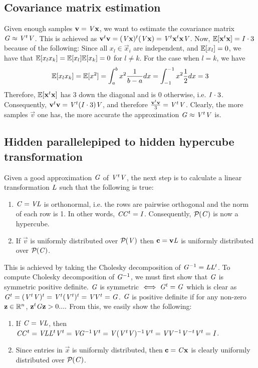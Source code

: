 \subsection{Covariance matrix estimation}
Given enough samples $\mathbf{v} = \mathit{V} \mathbf{x}$, we want to estimate the covariance matrix $\mathit{G} \approx \mathit{V}^t \mathit{V}$.
This is achieved as $\mathbf{v}^t \mathbf{v} = (\mathit{V} \mathbf{x})^t(\mathit{V} \mathbf{x}) = \mathit{V}^t \mathbf{x}^t \mathbf{x} \mathit{V}$.
Now, $\mathbb{E}[\mathbf{x}^t \mathbf{x}] = \mathit{I} \cdot 3$ because of the following:
Since all $x_l \in \vec{x}_i$ are independent, and $\mathbb{E}[x_l] = 0$, we have that $\mathbb{E}[x_l x_k] = \mathbb{E}[x_l] \mathbb{E}[x_k] = 0$ for $l \neq k$.
For the case when $l = k$, we have \[\mathbb{E}[x_l x_k] = \mathbb{E}[x ^2] = \int_{a}^{b} x^2 \frac{1}{b-a} dx = \int_{-1}^{-1} x^2 \frac{1}{2} dx = 3\]
Therefore, $\mathbb{E}[\mathbf{x}^t \mathbf{x}]$ has 3 down the diagonal and is 0 otherwise, i.e. $\mathit{I} \cdot 3$.
Consequently, $\mathbf{v} ^t \mathbf{v} = \mathit{V}^t (\mathit{I}\cdot 3) \mathit{V}$, and therefore $\frac{\mathbf{v}^t \mathbf{v}}{3} = \mathit{V}^t \mathit{V}$.
Clearly, the more samples $\vec{v}$ one has, the more accurate the approximation $\mathit{G} \approx \mathit{V} ^t \mathit{V}$ is.
\subsection{Hidden parallelepiped to hidden hypercube transformation}
Given a good approximation $\mathit{G}$ of $\mathit{V}^t \mathit{V}$, the next step is to calculate a linear transformation $\mathit{L}$ such that the following is true:
\begin{enumerate}
    \item $\mathit{C} = \mathit{V}\mathit{L}$ is orthonormal, i.e. the rows are pairwise orthogonal and the norm of each row is 1. In other words, $\mathit{C} \mathit{C}^t = \mathit{I}$. 
        Consequently, $\mathcal{P}_{}(\mathit{C})$ is now a hypercube.
    \item If $\vec{v}$ is uniformly distributed over $\mathcal{P}_{}(\mathit{V})$ then $\mathbf{c} = \mathbf{v} \mathit{L}$ is uniformly distributed over $\mathcal{P}_{}(\mathit{C})$.
\end{enumerate}
This is achieved by taking the Cholesky decomposition of $\mathit{G}^{-1} = \mathit{L} \mathit{L}^t$. 
To compute Cholesky decomposition of $\mathit{G}^{-1}$, we must first show that $\mathit{G}$ is symmetric positive definite.
$\mathit{G}$ is symmetric $\iff \mathit{G}^{t}= \mathit{G}$ which is clear as $\mathit{G}^t = (\mathit{V}^t\mathit{V})^t = \mathit{V}^t (\mathit{V}^t)^t = \mathit{V} \mathit{V}^t = \mathit{G}$.
$\mathit{G}$ is positive definite if for any non-zero $\mathbf{z} \in \mathbb{R}^n$, $\mathbf{z}^t \mathit{G} \mathbf{z} > 0....$
From this, we easily show the following:
\begin{enumerate}
    \item If $\mathit{C} = \mathit{V} \mathit{L}$, then $\mathit{C} \mathit{C}^t = \mathit{V} \mathit{L} \mathit{L}^t \mathit{V}^t = \mathit{V} \mathit{G}^{-1} \mathit{V}^t = \mathit{V} (\mathit{V^t}\mathit{V})^{-1} \mathit{V}^t
        = \mathit{V} \mathit{V}^{-1} \mathit{V}^{-t} \mathit{V}^t = \mathit{I}$.
    \item Since entries in $\vec{x}$ is uniformly distributed, then $\mathbf{c} = \mathit{C} \mathbf{x}$ is clearly uniformly distributed over $\mathcal{P}_{}(\mathit{C})$.
\end{enumerate}
